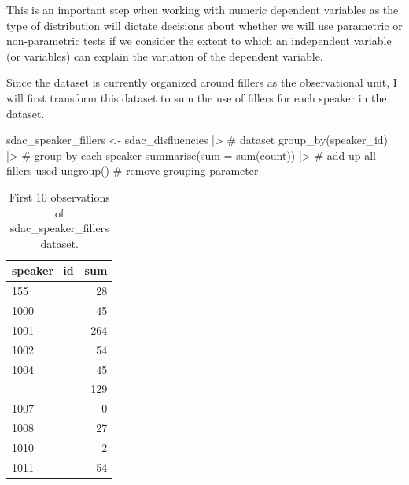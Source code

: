 \documentclass[
  letterpaper,
]{latex/krantz}
\newenvironment{Shaded}{\begin{snugshade}}{\end{snugshade}}
\newcommand{\AttributeTok}[1]{\textcolor[rgb]{0.40,0.45,0.13}{#1}}
\newcommand{\CommentTok}[1]{\textcolor[rgb]{0.37,0.37,0.37}{#1}}
\newcommand{\FunctionTok}[1]{\textcolor[rgb]{0.28,0.35,0.67}{#1}}
\newcommand{\NormalTok}[1]{\textcolor[rgb]{0.00,0.23,0.31}{#1}}
\newcommand{\OtherTok}[1]{\textcolor[rgb]{0.00,0.23,0.31}{#1}}
\newcommand{\SpecialCharTok}[1]{\textcolor[rgb]{0.37,0.37,0.37}{#1}}
\begin{document}
\begin{tcolorbox}[enhanced jigsaw, toprule=.15mm, bottomtitle=1mm, coltitle=black, title=\textcolor{quarto-callout-warning-color}{\faExclamationTriangle}\hspace{0.5em}{Tip}, left=2mm, colframe=quarto-callout-warning-color-frame, bottomrule=.15mm, colbacktitle=quarto-callout-warning-color!10!white, leftrule=.75mm, colback=white, titlerule=0mm, breakable, toptitle=1mm, opacityback=0, arc=.35mm, rightrule=.15mm, opacitybacktitle=0.6]

This is an important step when working with numeric dependent variables
as the type of distribution will dictate decisions about whether we will
use parametric or non-parametric tests if we consider the extent to
which an independent variable (or variables) can explain the variation
of the dependent variable.

\end{tcolorbox}

Since the dataset is currently organized around fillers as the
observational unit, I will first transform this dataset to sum the use
of fillers for each speaker in the dataset.

\begin{Shaded}
\begin{Highlighting}[]
\NormalTok{sdac\_speaker\_fillers }\OtherTok{\textless{}{-}} 
\NormalTok{  sdac\_disfluencies }\SpecialCharTok{|\textgreater{}} \CommentTok{\# dataset}
  \FunctionTok{group\_by}\NormalTok{(speaker\_id) }\SpecialCharTok{|\textgreater{}} \CommentTok{\# group by each speaker}
  \FunctionTok{summarise}\NormalTok{(}\AttributeTok{sum =} \FunctionTok{sum}\NormalTok{(count)) }\SpecialCharTok{|\textgreater{}} \CommentTok{\# add up all fillers used}
  \FunctionTok{ungroup}\NormalTok{() }\CommentTok{\# remove grouping parameter}
\end{Highlighting}
\end{Shaded}

\hypertarget{tbl-i-uni-cont-sdac-transform-preview}{}
\begin{table}
\caption{\label{tbl-i-uni-cont-sdac-transform-preview}First 10 observations of sdac\_speaker\_fillers dataset. }\tabularnewline

\centering
\begin{tabular}{lr}
\toprule
speaker\_id & sum\\
\midrule
155 & 28\\
1000 & 45\\
1001 & 264\\
1002 & 54\\
1004 & 45\\
\addlinespace
1005 & 129\\
1007 & 0\\
1008 & 27\\
1010 & 2\\
1011 & 54\\
\bottomrule
\end{tabular}
\end{table}
\end{document}
